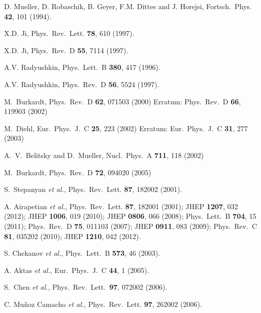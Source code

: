 \documentclass[twocolumn,nofootinbib,showpacs,prl,superscriptaddress,secnumarabic,amssymb,nobibnotes,aps,floatfix]{revtex4}
\begin{document}
\begin{thebibliography}{99}

D. Mueller, D. Robaschik, B. Geyer, F.M. Dittes and J. Horejsi,
Fortsch.\ Phys. {\bf 42}, 101 (1994).
  
X.D. Ji,
Phys.\ Rev.\ Lett. {\bf 78}, 610 (1997).

X.D. Ji,
Phys.\ Rev.\ D {\bf 55}, 7114 (1997).

A.V. Radyushkin,
Phys.\ Lett.\  B {\bf 380}, 417 (1996).

A.V. Radyushkin,
Phys.\ Rev.\ D {\bf 56}, 5524 (1997).

  M.~Burkardt,
  Phys.\ Rev.\ D {\bf 62}, 071503 (2000)
  Erratum: Phys.\ Rev.\ D {\bf 66}, 119903 (2002)

  M.~Diehl,
  Eur.\ Phys.\ J.\ C {\bf 25}, 223 (2002)
  Erratum: Eur.\ Phys.\ J.\ C {\bf 31}, 277 (2003)
 
  A.~V.~Belitsky and D.~Mueller,
  Nucl.\ Phys.\ A {\bf 711}, 118 (2002)

  M.~Burkardt,
  Phys.\ Rev.\ D {\bf 72}, 094020 (2005)

S.~Stepanyan {\it et al.},
Phys.\ Rev.\ Lett. {\bf 87}, 182002 (2001).

A. Airapetian {\it et al.},
Phys.\ Rev.\ Lett. {\bf 87}, 182001 (2001);
JHEP {\bf 1207}, 032 (2012);
JHEP {\bf 1006}, 019 (2010);
JHEP {\bf 0806}, 066 (2008);
Phys.\ Lett.\ B {\bf 704}, 15 (2011);
Phys.\ Rev.\  D {\bf 75}, 011103 (2007);
JHEP {\bf 0911}, 083 (2009);
Phys.\ Rev.\ C {\bf 81}, 035202 (2010);
JHEP {\bf 1210}, 042 (2012).

S. Chekanov {\it et al.},
Phys.\ Lett.\  B {\bf 573}, 46 (2003).

A. Aktas {\it et al.},
Eur.\ Phys.\ J.\ C {\bf 44}, 1 (2005).

S.~Chen {\it et al.},
Phys.\ Rev.\ Lett.\ {\bf 97}, 072002 (2006).

C. Mu\~noz Camacho {\it et al.},
Phys.\ Rev.\ Lett. {\bf 97}, 262002 (2006).


\end{thebibliography}
\end{document}
